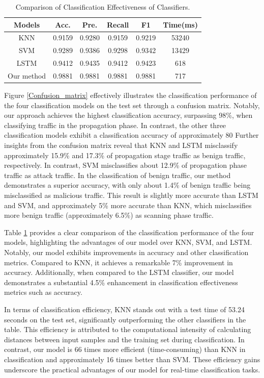 \documentclass[journal]{IEEEtai}
\begin{document}
\begin{table}[!h]
\centering
\caption{Comparison of Classification Effectiveness of Classifiers.}
\label{Comparison}
\begin{tabular}{|c|c|c|c|c|c|}
\hline
Models     & Acc.   & Pre.   & Recall & F1     & Time(ms) \\ \hline
KNN        & 0.9159 & 0.9280 & 0.9159 & 0.9219 & 53240    \\ \hline
SVM        & 0.9289 & 0.9386 & 0.9298 & 0.9342 & 13429    \\ \hline
LSTM       & 0.9412 & 0.9435 & 0.9412 & 0.9423 & 618      \\ \hline
Our method & 0.9881 & 0.9881 & 0.9881 & 0.9881 & 717      \\ \hline
\end{tabular}
\end{table}

Figure \ref{Confusion_matrix} effectively illustrates the classification performance of the four classification models on the test set through a confusion matrix. 
Notably, our approach achieves the highest classification accuracy, surpassing 98\%, when classifying traffic in the propagation phase. 
In contrast, the other three classification models exhibit a classification accuracy of approximately 80%
Further insights from the confusion matrix reveal that KNN and LSTM misclassify approximately 15.9\% and 17.3\% of propagation stage traffic as benign traffic, respectively. 
In contrast, SVM misclassifies about 12.9\% of propagation phase traffic as attack traffic.
In the classification of benign traffic, our method demonstrates a superior accuracy, with only about 1.4\% of benign traffic being misclassified as malicious traffic.
This result is slightly more accurate than LSTM and SVM, and approximately 5\% more accurate than KNN, which misclassifies more benign traffic (approximately 6.5\%) as scanning phase traffic.

Table \ref{Comparison} provides a clear comparison of the classification performance of the four models, highlighting the advantages of our model over KNN, SVM, and LSTM. 
Notably, our model exhibits improvements in accuracy and other classification metrics. Compared to KNN, it achieves a remarkable 7\% improvement in accuracy. Additionally, when compared to the LSTM classifier, our model demonstrates a substantial 4.5\% enhancement in classification effectiveness metrics such as accuracy.

In terms of classification efficiency, KNN stands out with a test time of 53.24 seconds on the test set, significantly outperforming the other classifiers in the table. This efficiency is attributed to the computational intensity of calculating distances between input samples and the training set during classification. In contrast, our model is 66 times more efficient (time-consuming) than KNN in classification and approximately 16 times better than SVM. These efficiency gains underscore the practical advantages of our model for real-time classification tasks.
\end{document}
